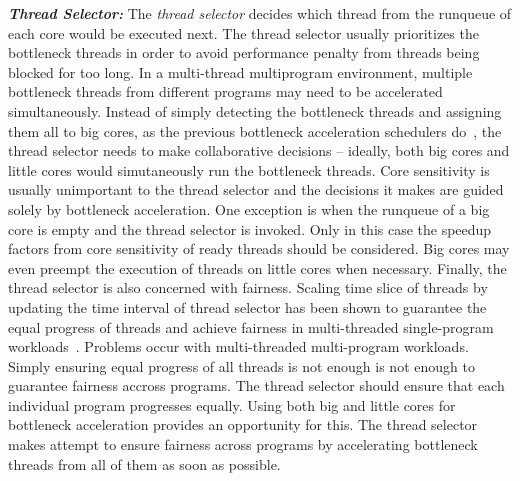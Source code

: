 \textbf{\textit{Thread Selector:}}
The \textit{thread selector} decides which thread from the runqueue of each core would be executed next. The thread selector usually prioritizes the bottleneck threads in order to avoid performance penalty from threads being blocked for too long. In a multi-thread multiprogram environment, multiple bottleneck threads from different programs may need to be accelerated simultaneously. Instead of simply detecting the bottleneck threads and assigning them all to big cores, as the previous bottleneck acceleration schedulers do~\cite{jibaja2016portable,joao2013utility,joao2012bottleneck}, the thread selector needs to make collaborative decisions -- ideally, both big cores and little cores would simutaneously run the bottleneck threads.
Core sensitivity is usually unimportant to the thread selector and the decisions it makes are guided solely by bottleneck acceleration. One exception is when the runqueue of a big core is empty and the thread selector is invoked. Only in this case the speedup factors from core sensitivity of ready threads should be considered. Big cores may even preempt the execution of threads on little cores when necessary.  
Finally, the thread selector is also concerned with fairness. Scaling time slice of threads by updating the time interval of thread selector has been shown to guarantee the equal progress of threads and achieve fairness in multi-threaded single-program workloads~\cite{van2013fairness}.
Problems occur with multi-threaded multi-program workloads. Simply ensuring equal progress of all threads is not enough is not enough to guarantee fairness accross programs. The thread selector should ensure that each individual program progresses equally. Using both big and little cores for bottleneck acceleration provides an opportunity for this. The thread selector makes attempt to ensure fairness across programs by accelerating bottleneck threads from all of them as soon as possible.




